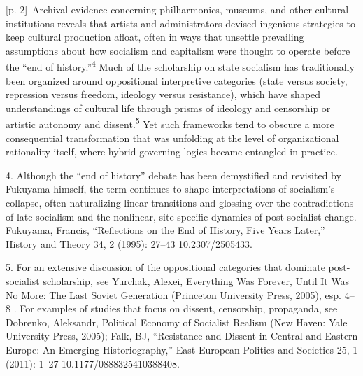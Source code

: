 \documentclass[10pt,a4paper]{article}
\begin{document}
{\scriptsize\color{gray} [p. 2]}\ Archival evidence concerning philharmonics, museums, and other cultural institutions reveals that artists and administrators devised ingenious strategies to keep cultural production afloat, often in ways that unsettle prevailing assumptions about how socialism and capitalism were thought to operate before the “end of history.”\nobreak\textsuperscript{4} Much of the scholarship on state socialism has traditionally been organized around oppositional interpretive categories (state versus society, repression versus freedom, ideology versus resistance), which have shaped understandings of cultural life through prisms of ideology and censorship or artistic autonomy and dissent.\nobreak\textsuperscript{5} Yet such frameworks tend to obscure a more consequential transformation that was unfolding at the level of organizational rationality itself, where hybrid governing logics became entangled in practice.\par{\small 4. Although the “end of history” debate has been demystified and revisited by Fukuyama himself, the term continues to shape interpretations of socialism’s collapse, often naturalizing linear transitions and glossing over the contradictions of late socialism and the nonlinear, site-specific dynamics of post-socialist change. Fukuyama, Francis, “Reflections on the End of History, Five Years Later,” History and Theory 34, 2 (1995): 27–43 10.2307/2505433.\par}{\small 5. For an extensive discussion of the oppositional categories that dominate post-socialist scholarship, see Yurchak, Alexei, Everything Was Forever, Until It Was No More: The Last Soviet Generation (Princeton University Press, 2005), esp. 4–8 . For examples of studies that focus on dissent, censorship, propaganda, see Dobrenko, Aleksandr, Political Economy of Socialist Realism (New Haven: Yale University Press, 2005); Falk, BJ, “Resistance and Dissent in Central and Eastern Europe: An Emerging Historiography,” East European Politics and Societies 25, 1 (2011): 1–27 10.1177/0888325410388408.\par}
\end{document}
